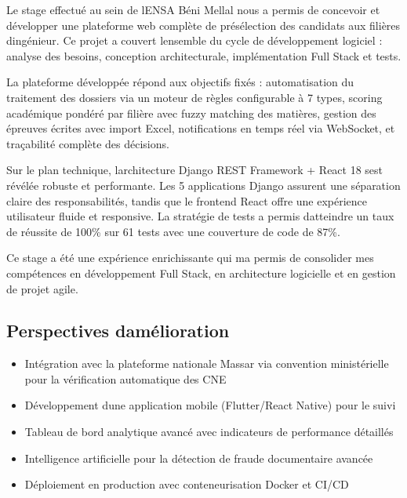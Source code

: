 \documentclass[
]{article}
\begin{document}
Le stage effectué au sein de l\textquotesingle ENSA Béni Mellal nous a
permis de concevoir et développer une plateforme web complète de
présélection des candidats aux filières d\textquotesingle ingénieur. Ce
projet a couvert l\textquotesingle ensemble du cycle de développement
logiciel : analyse des besoins, conception architecturale,
implémentation Full Stack et tests.

La plateforme développée répond aux objectifs fixés : automatisation du
traitement des dossiers via un moteur de règles configurable à 7 types,
scoring académique pondéré par filière avec fuzzy matching des matières,
gestion des épreuves écrites avec import Excel, notifications en temps
réel via WebSocket, et traçabilité complète des décisions.

Sur le plan technique, l\textquotesingle architecture Django REST
Framework + React 18 s\textquotesingle est révélée robuste et
performante. Les 5 applications Django assurent une séparation claire
des responsabilités, tandis que le frontend React offre une expérience
utilisateur fluide et responsive. La stratégie de tests a permis
d\textquotesingle atteindre un taux de réussite de 100\% sur 61 tests
avec une couverture de code de 87\%.

Ce stage a été une expérience enrichissante qui m\textquotesingle a
permis de consolider mes compétences en développement Full Stack, en
architecture logicielle et en gestion de projet agile.

\hypertarget{perspectives-damuxe9lioration}{%
\subsection{Perspectives
d\textquotesingle amélioration}\label{perspectives-damuxe9lioration}}

\begin{itemize}
\item
  Intégration avec la plateforme nationale Massar via convention
  ministérielle pour la vérification automatique des CNE
\item
  Développement d\textquotesingle une application mobile (Flutter/React
  Native) pour le suivi
\item
  Tableau de bord analytique avancé avec indicateurs de performance
  détaillés
\item
  Intelligence artificielle pour la détection de fraude documentaire
  avancée
\item
  Déploiement en production avec conteneurisation Docker et CI/CD
\end{itemize}
\end{document}
